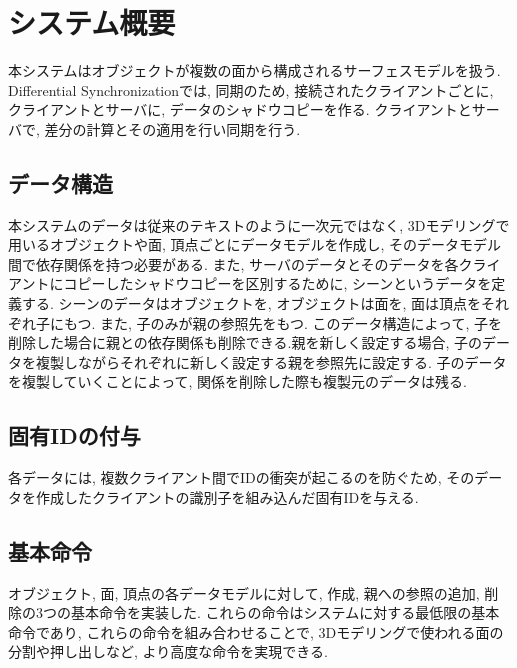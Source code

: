 \chapter{システム概要}
本システムはオブジェクトが複数の面から構成されるサーフェスモデルを扱う. Differential Synchronizationでは, 同期のため, 接続されたクライアントごとに, クライアントとサーバに, データのシャドウコピーを作る. クライアントとサーバで, 差分の計算とその適用を行い同期を行う.
 \section{データ構造}
 本システムのデータは従来のテキストのように一次元ではなく, 3Dモデリングで用いるオブジェクトや面, 頂点ごとにデータモデルを作成し, そのデータモデル間で依存関係を持つ必要がある.
 また, サーバのデータとそのデータを各クライアントにコピーしたシャドウコピーを区別するために, シーンというデータを定義する.
 シーンのデータはオブジェクトを, オブジェクトは面を, 面は頂点をそれぞれ子にもつ. また, 子のみが親の参照先をもつ.
 このデータ構造によって, 子を削除した場合に親との依存関係も削除できる.親を新しく設定する場合, 子のデータを複製しながらそれぞれに新しく設定する親を参照先に設定する.
 子のデータを複製していくことによって, 関係を削除した際も複製元のデータは残る.
 \section{固有IDの付与}
 各データには, 複数クライアント間でIDの衝突が起こるのを防ぐため, そのデータを作成したクライアントの識別子を組み込んだ固有IDを与える.
 \section{基本命令}
 オブジェクト, 面, 頂点の各データモデルに対して, 作成, 親への参照の追加, 削除の3つの基本命令を実装した.
 これらの命令はシステムに対する最低限の基本命令であり, これらの命令を組み合わせることで, 3Dモデリングで使われる面の分割や押し出しなど, より高度な命令を実現できる.
